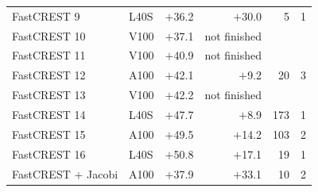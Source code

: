 \begin{tabular}{@{}llrrrr@{}}
FastCREST 9 & L40S & $+$36.2 & $+$30.0 & 5 & 1 \\
FastCREST 10 & V100 & $+$37.1 & not finished &  &  \\
FastCREST 11 & V100 & $+$40.9 & not finished &  &  \\
FastCREST 12 & A100 & $+$42.1 & $+$9.2 & 20 & 3 \\
FastCREST 13 & V100 & $+$42.2 & not finished &  &  \\
FastCREST 14 & L40S & $+$47.7 & $+$8.9 & 173 & 1 \\
FastCREST 15 & A100 & $+$49.5 & $+$14.2 & 103 & 2 \\
FastCREST 16 & L40S & $+$50.8 & $+$17.1 & 19 & 1 \\
FastCREST + Jacobi & A100 & $+$37.9 & $+$33.1 & 10 & 2 \\
\bottomrule
\end{tabular}
